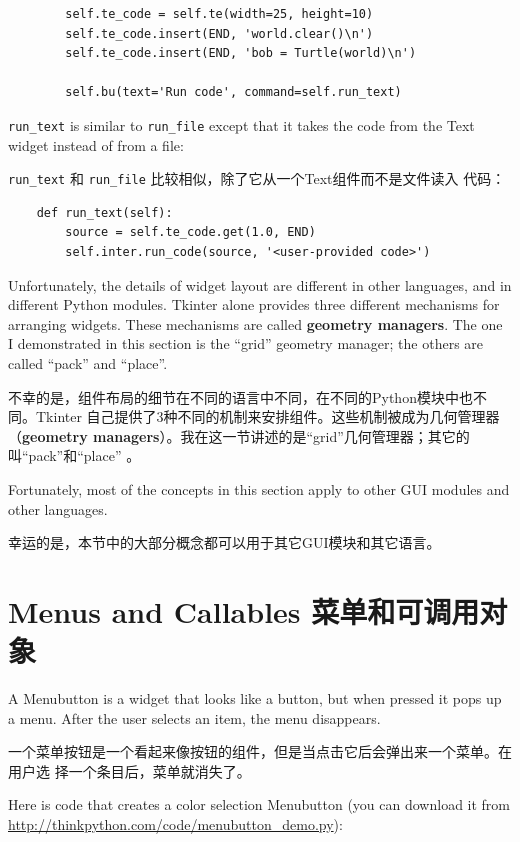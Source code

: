 \documentclass[10pt]{book}
\begin{document}
\begin{CJK}{UTF8}{gbsn}
\begin{verbatim}
        self.te_code = self.te(width=25, height=10)
        self.te_code.insert(END, 'world.clear()\n')
        self.te_code.insert(END, 'bob = Turtle(world)\n')

        self.bu(text='Run code', command=self.run_text)
\end{verbatim}
%
\verb"run_text" is similar to \verb"run_file" except that it takes
the code from the Text widget instead of from a file:

\verb"run_text" 和 \verb"run_file" 比较相似，除了它从一个Text组件而不是文件读入
代码：

\begin{verbatim}
    def run_text(self):
        source = self.te_code.get(1.0, END)
        self.inter.run_code(source, '<user-provided code>')
\end{verbatim}
%
Unfortunately, the details of widget layout are different in
other languages, and in different Python modules.
Tkinter alone provides three different mechanisms for arranging
widgets.  These mechanisms are called {\bf geometry managers}.
The one I demonstrated in this section is the ``grid'' geometry
manager; the others are called ``pack'' and ``place''.

不幸的是，组件布局的细节在不同的语言中不同，在不同的Python模块中也不同。Tkinter
自己提供了3种不同的机制来安排组件。这些机制被成为几何管理器（{\bf geometry
managers}）。我在这一节讲述的是``grid''几何管理器；其它的叫``pack''和``place''
。

Fortunately, most of the concepts in this section apply to
other GUI modules and other languages.

幸运的是，本节中的大部分概念都可以用于其它GUI模块和其它语言。

\section{Menus and Callables 菜单和可调用对象}

A Menubutton is a widget that looks like a button, but when pressed
it pops up a menu.  After the user selects an item, the menu
disappears.

一个菜单按钮是一个看起来像按钮的组件，但是当点击它后会弹出来一个菜单。在用户选
择一个条目后，菜单就消失了。

Here is code that creates a color selection Menubutton
(you can download it from \url{http://thinkpython.com/code/menubutton_demo.py}):


\end{CJK}
\end{document}
